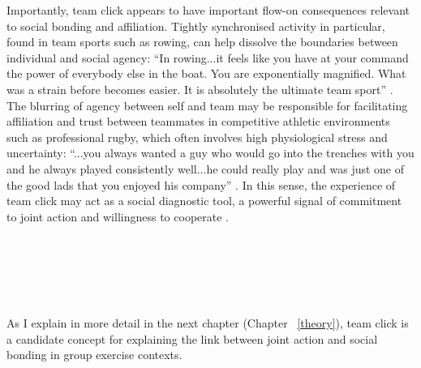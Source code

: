 \begin{CJK}{UTF8}{gbsn}
Importantly, team click appears to have important flow-on consequences relevant to social bonding and affiliation. Tightly synchronised activity in particular, found in team sports such as rowing, can help dissolve the boundaries between individual and social agency: ``In rowing...it feels like you have at your command the power of everybody else in the boat. You are exponentially magnified. What was a strain before becomes easier. It is absolutely the ultimate team sport'' \citep{Brown2016}.
The blurring of agency between self and team may be responsible for facilitating affiliation and trust between teammates in competitive athletic environments such as professional rugby, which often involves high physiological stress and uncertainty: ``...you always wanted a guy who would go into the trenches with you and he always played consistently well...he could really play and was just one of the good lads that you enjoyed his company'' \citep{Fox-Sports2017}. In this sense, the experience of team click may act as a social diagnostic tool, a powerful signal of commitment to joint action and willingness to cooperate \citep{Reddish2013a}. \\
\\
\\

\noindent{}

\\
\\
\\


As I explain in more detail in the next chapter (Chapter ~\ref{theory}), team click is a candidate concept for explaining the link between joint action and social bonding in group exercise contexts.


\end{CJK}
